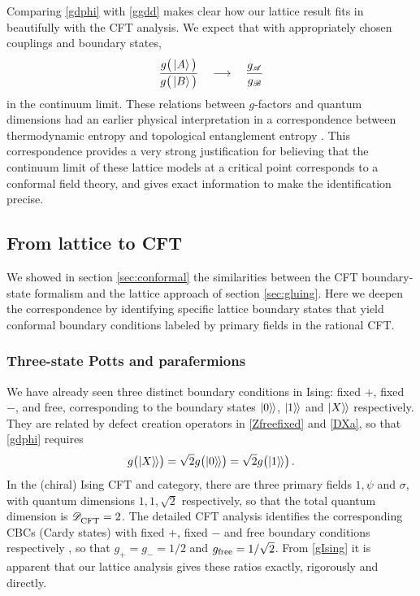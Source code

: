 Comparing \eqref{gdphi} with \eqref{ggdd} makes clear how our lattice result fits in beautifully with the CFT analysis. 
We expect that with appropriately chosen couplings and boundary states,
\begin{align}
\frac{g\big(\ket{A}\big)}{g\big(\ket{B}\big)}\quad\longrightarrow\quad \frac{g_\mathscr{A}}{g_\mathscr{B}}
\end{align}
in the continuum limit. These relations between $g$-factors and quantum dimensions had an earlier physical interpretation in a correspondence between thermodynamic entropy and topological entanglement entropy \cite{Fendley2006,Qi2012}. This correspondence provides a very strong justification for believing that the continuum limit of these lattice models at a critical point corresponds to a conformal field theory, and gives exact information to make the identification precise.

\subsection{From lattice to CFT}

We showed in section \ref{sec:conformal} the similarities between the CFT boundary-state formalism and the lattice approach of section \ref{sec:gluing}.
Here we deepen the correspondence by identifying specific lattice boundary states that yield
conformal boundary conditions labeled by primary fields in the rational CFT. 


\subsubsection{Three-state Potts and parafermions}

We have already seen three distinct boundary conditions in Ising: fixed $+$, fixed $-$, and free, corresponding to the boundary states ${|{0}\rangle\mkern-2mu\rangle}$, ${|{1}\rangle\mkern-2mu\rangle}$ and ${|{X}\rangle\mkern-2mu\rangle}$ respectively. 
They are related by defect creation operators in \eqref{Zfreefixed} and \eqref{DXa}, so that \eqref{gdphi} requires 
\begin{align}
g\big({|{X}\rangle\mkern-2mu\rangle}\big)=\sqrt{2} g\big({|{0}\rangle\mkern-2mu\rangle}\big)=\sqrt{2} g\big({|{1}\rangle\mkern-2mu\rangle}\big) \,.
\label{gIsing}
\end{align}
In the (chiral) Ising CFT and category, there are three primary fields $1,\psi$ and $\sigma$, with quantum dimensions $1,1,\sqrt{2}$ respectively, so that the total quantum dimension is $\mathscr{D}_{\rm CFT}^{}=2$. The detailed CFT analysis identifies the corresponding CBCs (Cardy states) with fixed $+$, fixed $-$ and free boundary conditions respectively \cite{Cardy1989}, so that $g_+=g_-=1/2$ and $g_{\rm free}=1/\sqrt{2}$. From \eqref{gIsing} it is apparent that our lattice analysis gives these ratios exactly, rigorously and directly. 

